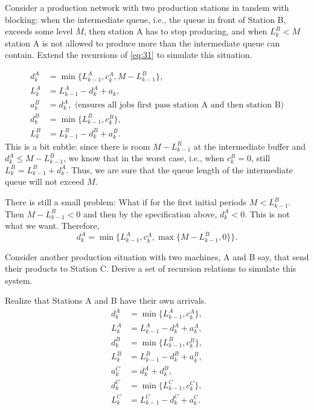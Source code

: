 \begin{extra}
  Consider a production network with two production stations in tandem
  with blocking: when the intermediate queue, i.e., the queue in front of
  Station B, exceeds some level $M$, then station A has to stop
  producing, and when $L^B_k < M$ station A is not allowed to produce
  more than the intermediate queue can contain. Extend the recursions
  of \eqref{eq:31} to simulate this situation.
\begin{solution}
\begin{equation}
  \begin{split}
    d^A_k &= \min\{L_{k-1}^A, c_k^A, M-L^B_{k-1}\}, \\
    L_k^A &= L_{k-1}^A -d_k^A + a_k, \\
    a_k^B &= d_{k}^A, \text{ (ensures all jobs first pass station A and then station B)}\\
    d^B_k &= \min\{L_{k-1}^B, c_k^B\}, \\
    L_k^B &= L_{k-1}^B -d_k^B + a_k^B.
  \end{split}
\end{equation}
This is a bit subtle: since there is room $M-L^B_{k-1}$ at the
intermediate buffer and $d_k^A \leq M-L^B_{k-1}$, we know that in the
worst case, i.e., when $c_k^B=0$, still $L^B_k = L_{k-1}^B +
d_k^A$.
Thus, we are sure that the queue length of the intermediate queue will
not exceed $M$.

There is still  a small problem: What if for the first initial periods  $M<L^B_{k-1}$. Then $M-L^B_{k-1}<0$ and then by the specification above, $d_k^A < 0$. This is not what we want. Therefore, 
\begin{equation*}
  d^A_k = \min\{L_{k-1}^A, c_k^A, \max\{M-L^B_{k-1}, 0\}\}.
\end{equation*}
\end{solution}
\end{extra}

\begin{exercise}
  Consider another production situation with two machines, A and B
  say, that send their products to Station C. Derive a set of
  recursion relations to simulate this system. 
\begin{solution}
Realize that Stations A and B have their own arrivals. 
\begin{equation}
  \begin{split}
    d^A_k &= \min\{L_{k-1}^A, c_k^A\}, \\
    L_k^A &= L_{k-1}^A -d_k^A + a_k^A, \\
    d^B_k &= \min\{L_{k-1}^B, c_k^B\}, \\
    L_k^B &= L_{k-1}^B -d_k^B + a_k^B, \\
    a_k^C &= d_{k}^A+d_{k}^B,\\
    d^C_k &= \min\{L_{k-1}^C, c_k^C\}, \\
    L_k^C &= L_{k-1}^C -d_k^C + a_k^C.
  \end{split}
\end{equation}
\end{solution}
\end{exercise}


